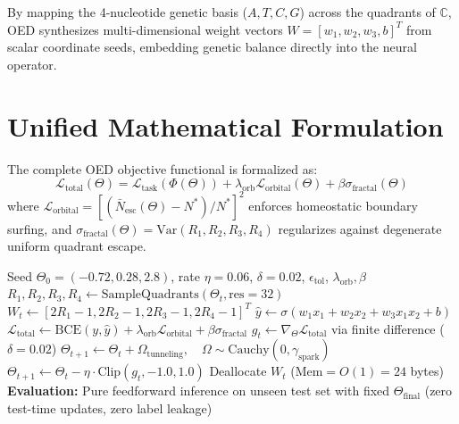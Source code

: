 \documentclass[10pt,journal,compsoc,twocolumn]{article}
\begin{document}
By mapping the 4-nucleotide genetic basis ($A, T, C, G$) across the quadrants of $\mathbb{C}$, OED synthesizes multi-dimensional weight vectors $W = [w_1, w_2, w_3, b]^T$ from scalar coordinate seeds, embedding genetic balance directly into the neural operator.

\section{Unified Mathematical Formulation}
\label{sec:formulation}
The complete OED objective functional is formalized as:
\begin{equation}
\mathcal{L}_{\mathrm{total}}(\Theta) = \mathcal{L}_{\mathrm{task}}(\Phi(\Theta)) + \lambda_{\mathrm{orb}} \mathcal{L}_{\mathrm{orbital}}(\Theta) + \beta \sigma_{\mathrm{fractal}}(\Theta)
\end{equation}
where $\mathcal{L}_{\mathrm{orbital}} = [ (\bar{N}_{\mathrm{esc}}(\Theta) - N^*) / N^* ]^2$ enforces homeostatic boundary surfing, and $\sigma_{\mathrm{fractal}}(\Theta) = \text{Var}(R_1, R_2, R_3, R_4)$ regularizes against degenerate uniform quadrant escape.

\begin{algorithm}[t]
\caption{Orbital Error Dynamics (OED) Optimization}
\label{alg:oed}
\begin{algorithmic}[1]
\Require Seed $\Theta_0 = (-0.72, 0.28, 2.8)$, rate $\eta = 0.06$, $\delta = 0.02$, $\epsilon_{\mathrm{tol}}$, $\lambda_{\mathrm{orb}}, \beta$
    \State $R_1, R_2, R_3, R_4 \gets \text{SampleQuadrants}(\Theta_t, \text{res}=32)$
    \State $W_t \gets [2R_1-1, 2R_2-1, 2R_3-1, 2R_4-1]^T$
    \State $\hat{y} \gets \sigma(w_1 x_1 + w_2 x_2 + w_3 x_1 x_2 + b)$
    \State $\mathcal{L}_{\mathrm{total}} \gets \text{BCE}(y, \hat{y}) + \lambda_{\mathrm{orb}} \mathcal{L}_{\mathrm{orbital}} + \beta \sigma_{\mathrm{fractal}}$
    \State $g_t \gets \nabla_\Theta \mathcal{L}_{\mathrm{total}}$ via finite difference ($\delta = 0.02$)
        \State $\Theta_{t+1} \gets \Theta_t + \Omega_{\mathrm{tunneling}}, \quad \Omega \sim \text{Cauchy}(0, \gamma_{\mathrm{spark}})$
    \Else
        \State $\Theta_{t+1} \gets \Theta_t - \eta \cdot \text{Clip}(g_t, -1.0, 1.0)$
    \EndIf
    \State Deallocate $W_t$ ($\text{Mem} = O(1) = 24$ bytes)
\EndFor
\State \textbf{Evaluation:} Pure feedforward inference on unseen test set with fixed $\Theta_{\mathrm{final}}$ (zero test-time updates, zero label leakage)
\end{algorithmic}
\end{algorithm}
\end{document}
